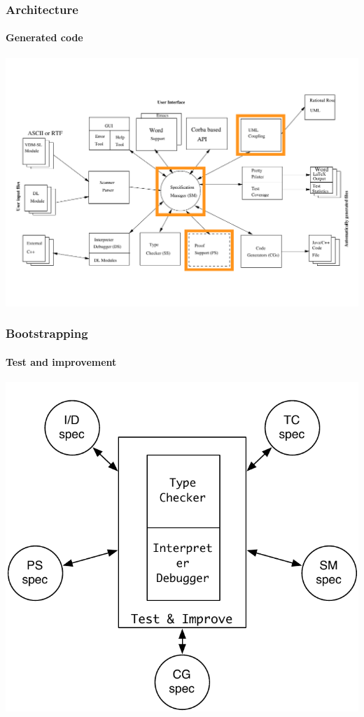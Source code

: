 \documentclass[slidestop,uncompress,mathserif,notes]{beamer}
\newcommand{\pgl}[0]{Peter Gorm Larsen}
\begin{document}
\begin{frame}[c]
  \frametitle{Architecture}
  \framesubtitle{Generated code}

  \begin{center}
    \includegraphics[width=\textwidth]{images/vdmtools_arch_cg.pdf}
  \end{center}
\end{frame}


\begin{frame}[c]
  \frametitle{Bootstrapping}
  \framesubtitle{Test and improvement}
 
  \begin{center}
    \includegraphics[width=.6\textwidth]{images/test_improve.pdf}
  \end{center}
\end{frame}
\end{document}
